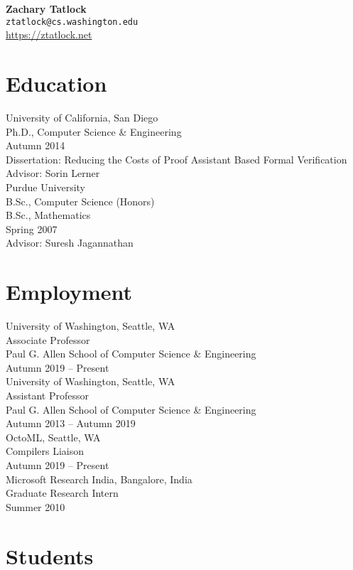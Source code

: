 \documentclass[10pt]{article}
\begin{document}
{\LARGE \textbf{Zachary Tatlock}} \\
\texttt{ztatlock@cs.washington.edu} \\
\url{https://ztatlock.net}

\section*{Education}

University of California, San Diego \\
Ph.D., Computer Science \& Engineering \\
Autumn 2014 \\
Dissertation: Reducing the Costs of Proof Assistant Based Formal Verification \\
Advisor: Sorin Lerner \\

Purdue University \\
B.Sc., Computer Science (Honors) \\
B.Sc., Mathematics \\
Spring 2007 \\
Advisor: Suresh Jagannathan

\section*{Employment}

University of Washington, Seattle, WA \\
Associate Professor \\
Paul G. Allen School of Computer Science \& Engineering \\
Autumn 2019 -- Present \\

University of Washington, Seattle, WA \\
Assistant Professor \\
Paul G. Allen School of Computer Science \& Engineering \\
Autumn 2013 -- Autumn 2019 \\

OctoML, Seattle, WA \\
Compilers Liaison \\
Autumn 2019 -- Present \\

Microsoft Research India, Bangalore, India \\
Graduate Research Intern \\
Summer 2010

\section*{Students}
\end{document}
